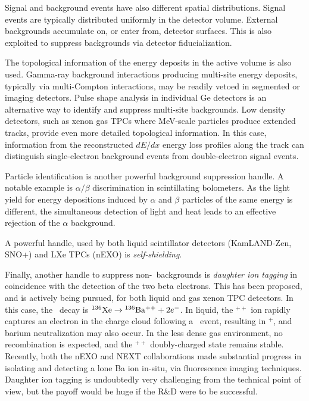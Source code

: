Signal and background events have also different spatial distributions. Signal events are typically distributed uniformly in the detector volume. External backgrounds accumulate on, or enter from, detector surfaces. This is also exploited to suppress backgrounds via detector fiducialization. 

The topological information of the energy deposits in the active volume is also used. Gamma-ray background interactions producing multi-site energy deposits, typically via multi-Compton interactions, may be readily vetoed in segmented or imaging detectors. Pulse shape analysis in individual Ge detectors is an alternative way to identify and suppress multi-site backgrounds. Low density detectors, such as xenon gas TPCs where MeV-scale particles produce extended tracks, provide even more detailed topological information. In this case, information from the reconstructed $dE/dx$ energy loss profiles along the track can distinguish single-electron background events from double-electron signal events.

Particle identification is another powerful background suppression handle. A notable example is $\alpha/\beta$ discrimination in scintillating bolometers. As the light yield for energy depositions induced by $\alpha$ and $\beta$ particles of the same energy is different, the simultaneous detection of light and heat leads to an effective rejection of the $\alpha$ background. 

A powerful handle, used by both liquid scintillator detectors (KamLAND-Zen, SNO+) and LXe TPCs (nEXO) is {\em self-shielding}. 

Finally, another handle to suppress non-\bbtnu\ backgrounds is \emph{daughter ion tagging} in coincidence with the detection of the two beta electrons. This has been proposed, and is actively being pursued, for both liquid and gas xenon TPC detectors. In this case, the \bbonu\ decay is ${\rm ^{136}Xe}\to {\rm ^{136}Ba^{++}}+2e^-$. In liquid, the $^{++}$ ion rapidly captures an electron in the charge cloud following a \bb\ event, resulting in $^{+}$, and barium neutralization may also occur. In the less dense gas environment, no recombination is expected, and the $^{++}$ doubly-charged state remains stable. Recently, both the nEXO \cite{nEXO:2018nxx} and NEXT \cite{McDonald:2017izm,Rivilla:2020cvm} collaborations made substantial progress in isolating and detecting a lone Ba ion in-situ, via fluorescence imaging techniques. Daughter ion tagging is undoubtedly very challenging from the technical point of view, but the payoff would be huge if the R\&D were to be successful.

